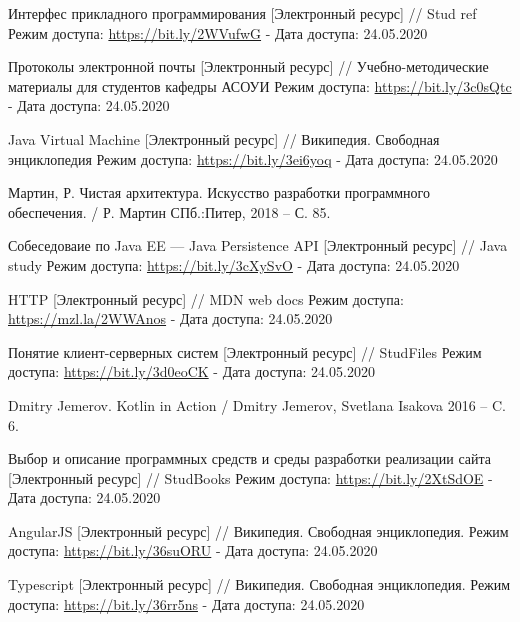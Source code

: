\begingroup
\begin{thebibliography}{11}

    Интерфес прикладного программирования
    [Электронный ресурс] //
    Stud ref
    Режим доступа: \url{https://bit.ly/2WVufwG} -
    Дата доступа: 24.05.2020
    
    Протоколы электронной почты
    [Электронный ресурс] //
    Учебно-методические материалы для студентов кафедры АСОУИ
    Режим доступа: \url{https://bit.ly/3c0sQtc} -
    Дата доступа: 24.05.2020
    
    Java Virtual Machine
    [Электронный ресурс] //
    Википедия. Свободная энциклопедия
    Режим доступа: \url{https://bit.ly/3ei6yoq} -
    Дата доступа: 24.05.2020

    Мартин, Р.
    Чистая архитектура. Искусство разработки программного обеспечения. /
    Р. Мартин 
    СПб.:Питер, 2018 -- С. 85.

    Собеседоваие по Java EE --- Java Persistence API
    [Электронный ресурс] //
    Java study
    Режим доступа: \url{https://bit.ly/3cXySvO} -
    Дата доступа: 24.05.2020

    HTTP
    [Электронный ресурс] //
    MDN web docs
    Режим доступа: \url{https://mzl.la/2WWAnos} -
    Дата доступа: 24.05.2020

    Понятие клиент-серверных систем
    [Электронный ресурс] //
    StudFiles
    Режим доступа: \url{https://bit.ly/3d0eoCK} -
    Дата доступа: 24.05.2020

    Dmitry Jemerov.
    Kotlin in Action /
    Dmitry Jemerov, Svetlana Isakova
    2016 -- C. 6.

    Выбор и описание программных средств и среды разработки реализации сайта
    [Электронный ресурс] //
    StudBooks
    Режим доступа: \url{https://bit.ly/2XtSdOE} -
    Дата доступа: 24.05.2020

    AngularJS
    [Электронный ресурс] //
    Википедия. Свободная энциклопедия.
    Режим доступа: \url{https://bit.ly/36suORU} -
    Дата доступа: 24.05.2020

    Typescript
    [Электронный ресурс] //
    Википедия. Свободная энциклопедия.
    Режим доступа: \url{https://bit.ly/36rr5ns} -
    Дата доступа: 24.05.2020

\end{thebibliography}
\endgroup

\clearpage